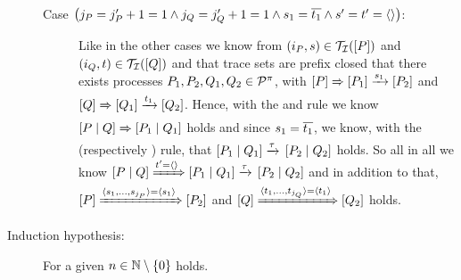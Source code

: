 \begin{prf}
\begin{description}
\begin{description}
		\item[Case $\left(j_P=j_P'+1=1\wedge j_Q=j_Q'+1=1\wedge s_{1}=\overline{t_{1}}\wedge s'=t'=\langle\rangle\right)$:] Like in the other cases we know from $\left(i_P,s\right)\in\mathcal{T_I}(\left[P\right])$ and $\left(i_Q,t\right)\in\mathcal{T_I}(\left[Q\right])$ and that trace sets are prefix closed that there exists processes $P_1,P_2,Q_1,Q_2\in\mathcal P^{\pi}$, with $\left[P\right]\xRightarrow{}\left[P_1\right]\xrightarrow{s_1}\left[P_2\right]$ and $\left[Q\right]\xRightarrow{}\left[Q_1\right]\xrightarrow{t_1}\left[Q_2\right]$. Hence, with the \eparl{} and \eparr{} rule we know $\left[P \mid Q\right]\xRightarrow{}\left[P_1 \mid Q_1\right]$ holds and since $s_1=\overline{t_1}$, we know, with the \ecoml{} (respectively \ecomr{}) rule, that $\left[P_1 \mid Q_1\right]\xrightarrow{\tau}{}\left[P_2 \mid Q_2\right]$ holds. So all in all we know $\left[P \mid Q\right]\xRightarrow{t'=\langle\rangle}\left[P_1 \mid Q_1\right]\xrightarrow{\tau}{}\left[P_2 \mid Q_2\right]$ and in addition to that, $\left[P\right]\xRightarrow{\langle s_1,\ldots,s_{j_P}\rangle=\langle s_1\rangle}\left[P_2\right]$ and $\left[Q\right]\xRightarrow{\langle t_1,\ldots,t_{j_Q}\rangle=\langle t_1\rangle}\left[Q_2\right]$ holds. 
	\end{description}

\item[Induction hypothesis:] For a given $n\in\N\setminus\set{0}$  holds.


\end{description}
\end{prf}
